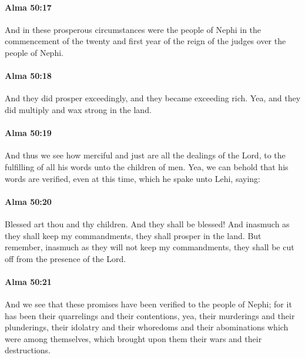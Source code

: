 		\paragraph{Alma 50:17} %
			\label{ALMA-50-17}

			And in these prosperous circumstances were the people of Nephi
			in the commencement of the twenty and first year
			of the reign of the judges over the people of Nephi.

		\paragraph{Alma 50:18} %
			\label{ALMA-50-18}

			And they did prosper exceedingly,
			and they became exceeding rich.
			Yea, and they did multiply and wax strong in the land.

		\paragraph{Alma 50:19} %
			\label{ALMA-50-19}

			And thus we see how merciful and just are all the dealings of the Lord,
			to the fulfilling of all his words unto the children of men.
			Yea, we can behold that his words are verified, even at this time,
			which he spake unto Lehi, saying:

		\paragraph{Alma 50:20} %
			\label{ALMA-50-20}

			Blessed art thou and thy children.
			And they shall be blessed!
			And inasmuch as they shall keep my commandments,
			they shall prosper in the land.
			But remember, inasmuch as they will not keep my commandments,
			they shall be cut off from the presence of the Lord.

		\paragraph{Alma 50:21} %
			\label{ALMA-50-21}

			And we see that these promises have been verified to the people of Nephi;
			for it has been their quarrelings and their contentions,
			yea, their murderings and their plunderings,
			their idolatry and their whoredoms and their abominations
			which were among themselves,
			which brought upon them their wars and their destructions.

